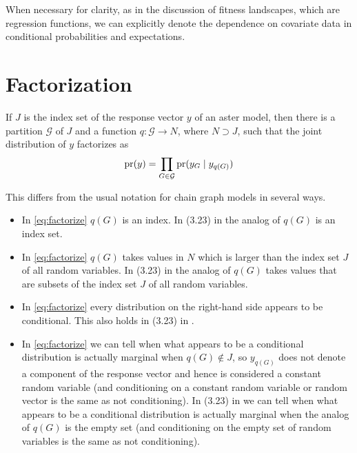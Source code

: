 When necessary for clarity, as in the discussion of fitness landscapes,
which are regression functions,
we can explicitly denote the dependence on covariate data in conditional
probabilities and expectations.

\section{Factorization}
\label{sec:factorization}

If $J$ is the index set of the response vector $y$ of an aster model,
then there is a partition $\mathcal{G}$ of $J$
and a function $q : \mathcal{G} \to N$, where $N \supset J$, such that
the joint distribution of $y$ factorizes as
\begin{equation} \label{eq:factorize}
   \operatorname{pr}(y) = \prod_{G \in \mathcal{G}} \operatorname{pr}(y_G \mid y_{q(G)})
\end{equation}

This differs from the usual notation for chain graph models
\citep[equation~3.23]{lauritzen} in several ways.
\begin{itemize}
\item In \eqref{eq:factorize} $q(G)$ is an index.
      In (3.23) in \citet{lauritzen} the analog of $q(G)$ is an index set.

\item In \eqref{eq:factorize} $q(G)$ takes values in $N$ which is larger
      than the index set $J$ of all random variables.
      In (3.23) in \citet{lauritzen} the analog of $q(G)$ takes values that
      are subsets of the index set $J$ of all random variables.

\item In \eqref{eq:factorize} every distribution on the right-hand side
      appears to be conditional.
      This also holds in (3.23) in \citet{lauritzen}.

\item In \eqref{eq:factorize} we can tell when what appears to be a conditional
      distribution is actually marginal when $q(G) \notin J$, so $y_{q(G)}$
      does not denote a component of the response vector and hence is
      considered a constant random variable (and conditioning on a constant
      random variable or random vector is the same as not conditioning).
      In (3.23) in \citet{lauritzen} we can tell when what appears to be
      a conditional distribution is actually marginal when the analog of
      $q(G)$ is the empty set (and conditioning on the empty set of
      random variables is the same as not conditioning).
\end{itemize}

